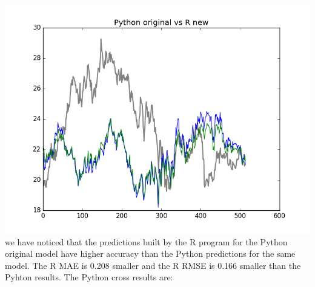 \documentclass [twoside,
  11pt, a4paper,
  footinclude=true,
  headinclude=true,
  cleardoublepage=empty
]{article}
\begin{document}
\includegraphics[scale=0.75]{img_examples/PythonOriginalVsRNew.png}
we have noticed that the predictions built by the R program for the Python original model have higher accuracy than the Python predictions for the same model. The R MAE is 0.208 smaller and the R RMSE is 0.166 smaller than the Pyhton results.
The Python cross results are:
\end{document}
